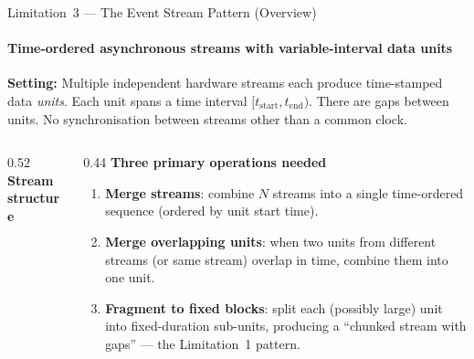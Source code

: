 \documentclass[aspectratio=169,10pt]{beamer}
\begin{document}
\begin{frame}{Limitation~3 --- The Event Stream Pattern (Overview)}
  \framesubtitle{Time-ordered asynchronous streams with variable-interval data units}

  \textbf{Setting:} Multiple independent hardware streams each produce
  time-stamped data \emph{units}.  Each unit spans a time interval
  $[t_{\mathrm{start}}, t_{\mathrm{end}})$.  There are gaps between
  units.  No synchronisation between streams other than a common clock.

  \medskip
  \begin{columns}[T]
    \begin{column}{0.52\textwidth}
      \textbf{Stream structure} \\[4pt]
      \small
    \end{column}
    \begin{column}{0.44\textwidth}
      \textbf{Three primary operations needed} \\[4pt]
      \small
      \begin{enumerate}
        \item \textbf{Merge streams}: combine $N$ streams into a single
              time-ordered sequence (ordered by unit start time).
        \item \textbf{Merge overlapping units}: when two units from
              different streams (or same stream) overlap in time, combine
              them into one unit.
        \item \textbf{Fragment to fixed blocks}: split each (possibly
              large) unit into fixed-duration sub-units, producing a
              ``chunked stream with gaps'' --- the Limitation~1 pattern.
      \end{enumerate}
    \end{column}
  \end{columns}


\end{frame}
\end{document}
